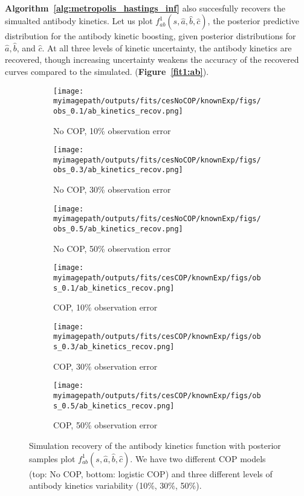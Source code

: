 \documentclass{article}
\newcommand{\myimagepath}{/Users/davidhodgson/Dropbox/Mac (3)/Documents/research/Rpackages/rjmc/}
\begin{document}
\paragraph{} \textbf{Algorithm~\ref{alg:metropolis_hastings_inf}} also succesfully recovers the simualted antibody kinetics. Let us plot $f^1_{ab}(s, \hat{a}, \hat{b}, \hat{c})$, the posterior predictive distribution for the antibody kinetic boosting, given posterior distributions for $ \hat{a}, \hat{b}$, and $\hat{c}$. At all three levels of kinetic uncertainty, the antibody kinetics are recovered, though increasing uncertainty weakens the accuracy of the recovered curves compared to the simulated. (\textbf{Figure~\ref{fit1:ab}}).

\begin{figure}[H]
\label{fit1:ab}
    \centering
    \begin{subfigure}{0.31\textwidth}
        \centering
        \texttt{[image: \\myimagepath/outputs/fits/cesNoCOP/knownExp/figs/obs\_0.1/ab\_kinetics\_recov.png]}
        \caption{No COP, 10\% observation error}
    \end{subfigure}
    \begin{subfigure}{0.31\textwidth}
        \centering
        \texttt{[image: \\myimagepath/outputs/fits/cesNoCOP/knownExp/figs/obs\_0.3/ab\_kinetics\_recov.png]}
        \caption{No COP, 30\% observation error}
    \end{subfigure}
    \begin{subfigure}{0.31\textwidth}
        \centering
        \texttt{[image: \\myimagepath/outputs/fits/cesNoCOP/knownExp/figs/obs\_0.5/ab\_kinetics\_recov.png]}
        \caption{No COP, 50\% observation error}
    \end{subfigure}
    
  \begin{subfigure}{0.31\textwidth}
        \centering
        \texttt{[image: \\myimagepath/outputs/fits/cesCOP/knownExp/figs/obs\_0.1/ab\_kinetics\_recov.png]}
        \caption{ COP, 10\% observation error}
    \end{subfigure}
    \begin{subfigure}{0.31\textwidth}
        \centering
        \texttt{[image: \\myimagepath/outputs/fits/cesCOP/knownExp/figs/obs\_0.3/ab\_kinetics\_recov.png]}
        \caption{ COP, 30\% observation error}
    \end{subfigure}
    \begin{subfigure}{0.31\textwidth}
        \centering
        \texttt{[image: \\myimagepath/outputs/fits/cesCOP/knownExp/figs/obs\_0.5/ab\_kinetics\_recov.png]}
        \caption{ COP, 50\% observation error}
    \end{subfigure}
    
    \caption{Simulation recovery of the antibody kinetics function with posterior samples plot $f^1_{ab}(s, \hat{a}, \hat{b}, \hat{c})$. We have two different COP models (top: No COP, bottom: logistic COP) and three different levels of antibody kinetics variability (10\%, 30\%, 50\%).}

\end{figure}
\end{document}
